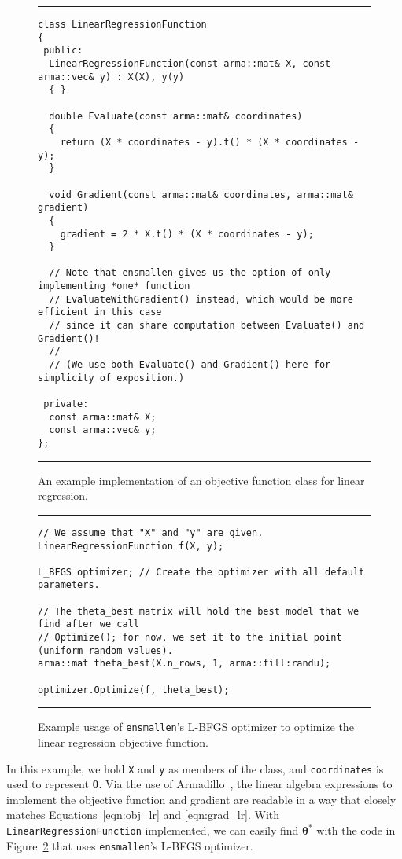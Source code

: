 \begin{figure}[t!]
\hrule
\vspace{1ex}
\begin{verbatim}
class LinearRegressionFunction
{
 public:
  LinearRegressionFunction(const arma::mat& X, const arma::vec& y) : X(X), y(y)
  { }

  double Evaluate(const arma::mat& coordinates)
  {
    return (X * coordinates - y).t() * (X * coordinates - y);
  }

  void Gradient(const arma::mat& coordinates, arma::mat& gradient)
  {
    gradient = 2 * X.t() * (X * coordinates - y);
  }

  // Note that ensmallen gives us the option of only implementing *one* function
  // EvaluateWithGradient() instead, which would be more efficient in this case
  // since it can share computation between Evaluate() and Gradient()!
  //
  // (We use both Evaluate() and Gradient() here for simplicity of exposition.)

 private:
  const arma::mat& X;
  const arma::vec& y;
};
\end{verbatim}
\hrule
\vspace*{-0.5em}
\caption{An example implementation of an objective function class for linear
regression.}
\label{fig:lr_function}
\end{figure}
\begin{figure}[t!]

\hrule
\vspace{1ex}
\begin{verbatim}
// We assume that "X" and "y" are given.
LinearRegressionFunction f(X, y);

L_BFGS optimizer; // Create the optimizer with all default parameters.

// The theta_best matrix will hold the best model that we find after we call
// Optimize(); for now, we set it to the initial point (uniform random values).
arma::mat theta_best(X.n_rows, 1, arma::fill:randu);

optimizer.Optimize(f, theta_best);
\end{verbatim}
\hrule
\vspace*{-0.5em}
\caption{Example usage of {\tt ensmallen}'s L-BFGS optimizer to optimize the
linear regression objective function.}
\label{fig:lbfgs_lr_opt}
\end{figure}

In this example, we hold {\tt \small X} and {\tt \small y} as members of the
class, and {\tt \small coordinates} is used to represent $\bm \theta$.  Via the
use of Armadillo~\cite{sanderson2016armadillo}, the linear algebra expressions
to implement the objective function and gradient are readable in a way that
closely matches Equations~\ref{eqn:obj_lr} and \ref{eqn:grad_lr}.  With {\tt
\small LinearRegressionFunction} implemented, we can easily find $\bm \theta^*$
with the code in Figure~\ref{fig:lbfgs_lr_opt} that uses {\tt ensmallen}'s
L-BFGS optimizer.

